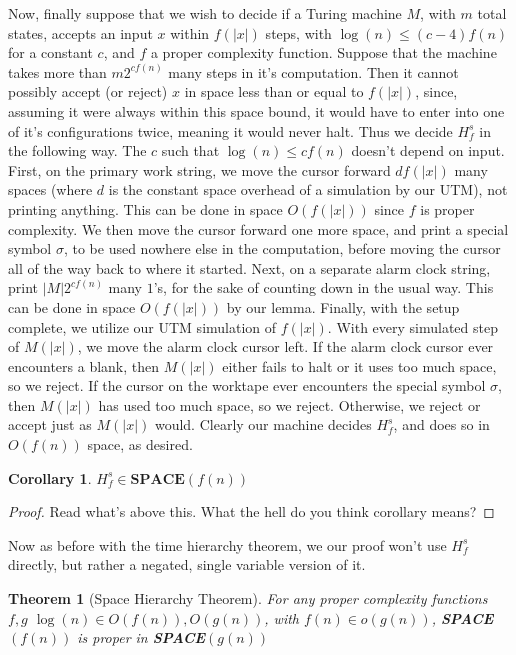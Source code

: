 \documentclass{article}
\theoremstyle{definition}
\theoremstyle{plain}
\theoremstyle{theorem}
\newtheorem{theorem}{Theorem}[section]
\newtheorem{corollary}{Corollary}[section]
\begin{document}
\par Now, finally suppose that we wish to decide if a Turing machine $M$, with $m$ total states, accepts an input $x$ within $f(|x|)$ steps, with $\log(n) \leq (c-4)f(n)$ for a constant $c$, and $f$ a proper complexity function. Suppose that the machine takes more than $m2^{cf(n)}$ many steps in it's computation. Then it cannot possibly accept (or reject) $x$ in space less than or equal to $f(|x|)$, since, assuming it were always within this space bound, it would have to enter into one of it's configurations twice, meaning it would never halt. Thus we decide $H^s_f$ in the following way. The $c$ such that $\log(n) \leq cf(n)$ doesn't depend on input. First, on the primary work string, we move the cursor forward $df(|x|)$ many spaces (where $d$ is the constant space overhead of a simulation by our UTM), not printing anything. This can be done in space $O(f(|x|))$ since $f$ is proper complexity. We then move the cursor forward one more space, and print a special symbol $\sigma$, to be used nowhere else in the computation, before moving the cursor all of the way back to where it started. Next, on a separate alarm clock string, print $|M|2^{cf(n)}$ many $1$'s, for the sake of counting down in the usual way. This can be done in space $O(f(|x|))$ by our lemma. Finally, with the setup complete, we utilize our UTM simulation of $f(|x|)$. With every simulated step of $M(|x|)$, we move the alarm clock cursor left. If the alarm clock cursor ever encounters a blank, then $M(|x|)$ either fails to halt or it uses too much space, so we reject. If the cursor on the worktape ever encounters the special symbol $\sigma$, then $M(|x|)$ has used too much space, so we reject. Otherwise, we reject or accept just as $M(|x|)$ would. Clearly our machine decides $H^s_f$, and does so in $O(f(n))$ space, as desired.
\begin{corollary}
	$H^s_f \in \textbf{SPACE}(f(n))$
\end{corollary}
\begin{proof}
	Read what's above this. What the hell do you think corollary means?
\end{proof}
Now as before with the time hierarchy theorem, we our proof won't use $H^s_f$ directly, but rather a negated, single variable version of it.
\begin{theorem}[Space Hierarchy Theorem]
	For any proper complexity functions $f,g$ $\log(n) \in O(f(n)),O(g(n))$, with $f(n) \in o(g(n))$, \textbf{SPACE}$(f(n))$ is proper in \textbf{SPACE}$(g(n))$
\end{theorem}
\end{document}
